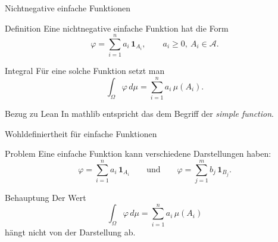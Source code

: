 \documentclass{beamer}
\begin{document}
\begin{frame}{Nichtnegative einfache Funktionen}
\begin{block}{Definition}
Eine nichtnegative einfache Funktion hat die Form
\[
\varphi=\sum_{i=1}^n a_i\,\mathbf 1_{A_i},
\qquad
a_i\ge 0,\ A_i\in\mathcal A.
\]
\end{block}

\begin{block}{Integral}
Für eine solche Funktion setzt man
\[
\int_\Omega \varphi\,d\mu
=
\sum_{i=1}^n a_i\,\mu(A_i).
\]
\end{block}

\begin{block}{Bezug zu Lean}
In mathlib entspricht das dem Begriff der \emph{simple function}.
\end{block}
\end{frame}




\begin{frame}{Wohldefiniertheit für einfache Funktionen}
\begin{block}{Problem}
Eine einfache Funktion kann verschiedene Darstellungen haben:
\[
\varphi=\sum_{i=1}^n a_i\,\mathbf 1_{A_i}
\qquad\text{und}\qquad
\varphi=\sum_{j=1}^m b_j\,\mathbf 1_{B_j}.
\]
\end{block}

\begin{block}{Behauptung}
Der Wert
\[
\int_\Omega \varphi\,d\mu
=
\sum_{i=1}^n a_i\,\mu(A_i)
\]
hängt nicht von der Darstellung ab.
\end{block}
\end{frame}
\end{document}
